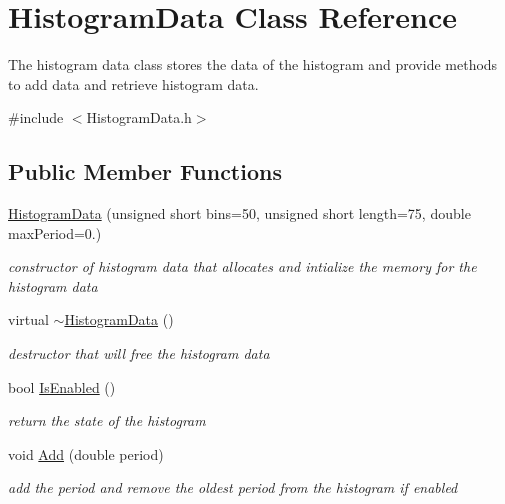 \hypertarget{classHistogramData}{}\section{Histogram\+Data Class Reference}
\label{classHistogramData}


The histogram data class stores the data of the histogram and provide methods to add data and retrieve histogram data.  




{\ttfamily \#include $<$Histogram\+Data.\+h$>$}

\subsection*{Public Member Functions}
\begin{DoxyCompactItemize}
\item 
\mbox{\label{classHistogramData_a382c81f15b29a67116f3fb30d9a33b8a}} 
\hyperlink{classHistogramData_a382c81f15b29a67116f3fb30d9a33b8a}{Histogram\+Data} (unsigned short bins=50, unsigned short length=75, double max\+Period=0.)
\begin{DoxyCompactList}\small\item\em constructor of histogram data that allocates and intialize the memory for the histogram data \end{DoxyCompactList}\item 
\mbox{\label{classHistogramData_a4469655db4ea251dc664d6537ac56c5a}} 
virtual \hyperlink{classHistogramData_a4469655db4ea251dc664d6537ac56c5a}{$\sim$\+Histogram\+Data} ()
\begin{DoxyCompactList}\small\item\em destructor that will free the histogram data \end{DoxyCompactList}\item 
bool \hyperlink{classHistogramData_ae0639913744c2edaa4d688b22a753b6e}{Is\+Enabled} ()
\begin{DoxyCompactList}\small\item\em return the state of the histogram \end{DoxyCompactList}\item 
void \hyperlink{classHistogramData_ab9313f2ca9852a85fd9f7da57c40f95b}{Add} (double period)
\begin{DoxyCompactList}\small\item\em add the period and remove the oldest period from the histogram if enabled \end{DoxyCompactList}\item 

\end{DoxyCompactItemize}

